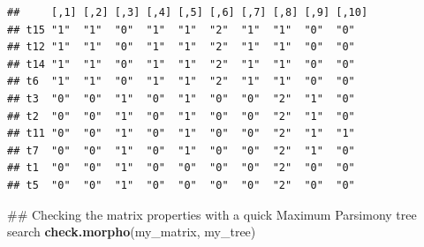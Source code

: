 \documentclass[]{book}
\newenvironment{Shaded}{\begin{snugshade}}{\end{snugshade}}
\newcommand{\KeywordTok}[1]{\textcolor[rgb]{0.13,0.29,0.53}{\textbf{#1}}}
\newcommand{\DataTypeTok}[1]{\textcolor[rgb]{0.13,0.29,0.53}{#1}}
\newcommand{\DecValTok}[1]{\textcolor[rgb]{0.00,0.00,0.81}{#1}}
\newcommand{\FloatTok}[1]{\textcolor[rgb]{0.00,0.00,0.81}{#1}}
\newcommand{\StringTok}[1]{\textcolor[rgb]{0.31,0.60,0.02}{#1}}
\newcommand{\OtherTok}[1]{\textcolor[rgb]{0.56,0.35,0.01}{#1}}
\newcommand{\OperatorTok}[1]{\textcolor[rgb]{0.81,0.36,0.00}{\textbf{#1}}}
\newcommand{\NormalTok}[1]{#1}
\theoremstyle{definition}
\theoremstyle{definition}
\theoremstyle{definition}
\theoremstyle{remark}
\begin{document}
\begin{Shaded}
\end{Shaded}

\begin{verbatim}
##     [,1] [,2] [,3] [,4] [,5] [,6] [,7] [,8] [,9] [,10]
## t15 "1"  "1"  "0"  "1"  "1"  "2"  "1"  "1"  "0"  "0"  
## t12 "1"  "1"  "0"  "1"  "1"  "2"  "1"  "1"  "0"  "0"  
## t14 "1"  "1"  "0"  "1"  "1"  "2"  "1"  "1"  "0"  "0"  
## t6  "1"  "1"  "0"  "1"  "1"  "2"  "1"  "1"  "0"  "0"  
## t3  "0"  "0"  "1"  "0"  "1"  "0"  "0"  "2"  "1"  "0"  
## t2  "0"  "0"  "1"  "0"  "1"  "0"  "0"  "2"  "1"  "0"  
## t11 "0"  "0"  "1"  "0"  "1"  "0"  "0"  "2"  "1"  "1"  
## t7  "0"  "0"  "1"  "0"  "1"  "0"  "0"  "2"  "1"  "0"  
## t1  "0"  "0"  "1"  "0"  "0"  "0"  "0"  "2"  "0"  "0"  
## t5  "0"  "0"  "1"  "0"  "0"  "0"  "0"  "2"  "0"  "0"
\end{verbatim}

\begin{Shaded}
\begin{Highlighting}[]
\NormalTok{## Checking the matrix properties with a quick Maximum Parsimony tree search}
\KeywordTok{check.morpho}\NormalTok{(my_matrix, my_tree)}
\end{Highlighting}
\end{Shaded}
\end{document}
